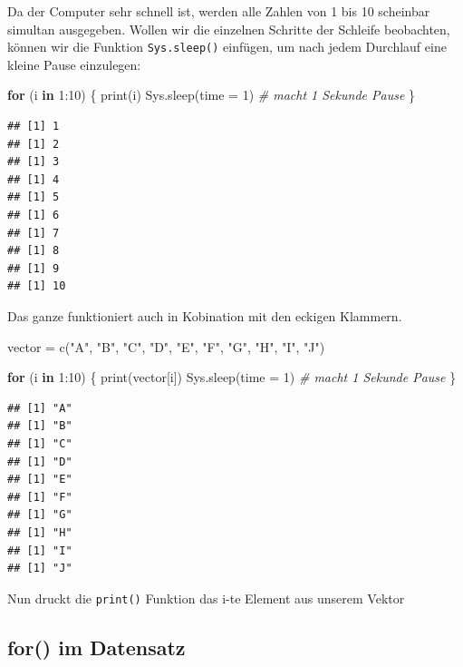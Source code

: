 \documentclass[
]{book}
\newenvironment{Shaded}{\begin{snugshade}}{\end{snugshade}}
\newcommand{\AttributeTok}[1]{\textcolor[rgb]{0.77,0.63,0.00}{#1}}
\newcommand{\CommentTok}[1]{\textcolor[rgb]{0.56,0.35,0.01}{\textit{#1}}}
\newcommand{\ControlFlowTok}[1]{\textcolor[rgb]{0.13,0.29,0.53}{\textbf{#1}}}
\newcommand{\DecValTok}[1]{\textcolor[rgb]{0.00,0.00,0.81}{#1}}
\newcommand{\FunctionTok}[1]{\textcolor[rgb]{0.00,0.00,0.00}{#1}}
\newcommand{\NormalTok}[1]{#1}
\newcommand{\OtherTok}[1]{\textcolor[rgb]{0.56,0.35,0.01}{#1}}
\newcommand{\SpecialCharTok}[1]{\textcolor[rgb]{0.00,0.00,0.00}{#1}}
\newcommand{\StringTok}[1]{\textcolor[rgb]{0.31,0.60,0.02}{#1}}
\begin{document}
Da der Computer sehr schnell ist, werden alle Zahlen von 1 bis 10 scheinbar simultan ausgegeben. Wollen wir die einzelnen Schritte der Schleife beobachten, können wir die Funktion \texttt{Sys.sleep()} einfügen, um nach jedem Durchlauf eine kleine Pause einzulegen:

\begin{Shaded}
\begin{Highlighting}[]
\ControlFlowTok{for}\NormalTok{ (i }\ControlFlowTok{in} \DecValTok{1}\SpecialCharTok{:}\DecValTok{10}\NormalTok{) \{}
  \FunctionTok{print}\NormalTok{(i)}
  \FunctionTok{Sys.sleep}\NormalTok{(}\AttributeTok{time =} \DecValTok{1}\NormalTok{) }\CommentTok{\# macht 1 Sekunde Pause}
\NormalTok{\}}
\end{Highlighting}
\end{Shaded}

\begin{verbatim}
## [1] 1
## [1] 2
## [1] 3
## [1] 4
## [1] 5
## [1] 6
## [1] 7
## [1] 8
## [1] 9
## [1] 10
\end{verbatim}

Das ganze funktioniert auch in Kobination mit den eckigen Klammern.

\begin{Shaded}
\begin{Highlighting}[]
\NormalTok{vector }\OtherTok{=} \FunctionTok{c}\NormalTok{(}\StringTok{"A"}\NormalTok{, }\StringTok{"B"}\NormalTok{, }\StringTok{"C"}\NormalTok{, }\StringTok{"D"}\NormalTok{, }\StringTok{"E"}\NormalTok{, }\StringTok{"F"}\NormalTok{, }\StringTok{"G"}\NormalTok{, }\StringTok{"H"}\NormalTok{, }\StringTok{"I"}\NormalTok{, }\StringTok{"J"}\NormalTok{)}

\ControlFlowTok{for}\NormalTok{ (i }\ControlFlowTok{in} \DecValTok{1}\SpecialCharTok{:}\DecValTok{10}\NormalTok{) \{}
  \FunctionTok{print}\NormalTok{(vector[i])}
  \FunctionTok{Sys.sleep}\NormalTok{(}\AttributeTok{time =} \DecValTok{1}\NormalTok{) }\CommentTok{\# macht 1 Sekunde Pause}
\NormalTok{\}}
\end{Highlighting}
\end{Shaded}

\begin{verbatim}
## [1] "A"
## [1] "B"
## [1] "C"
## [1] "D"
## [1] "E"
## [1] "F"
## [1] "G"
## [1] "H"
## [1] "I"
## [1] "J"
\end{verbatim}

Nun druckt die \texttt{print()} Funktion das i-te Element aus unserem Vektor

\hypertarget{for-im-datensatz}{%
\subsection{for() im Datensatz}\label{for-im-datensatz}}
\end{document}
